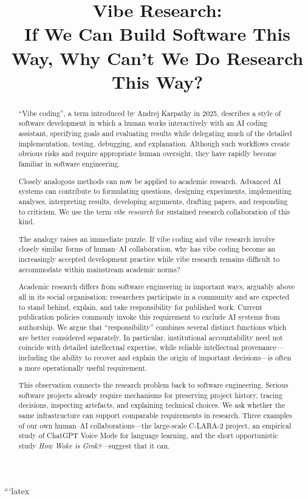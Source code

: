 ```latex
\title{Vibe Research:\\
If We Can Build Software This Way, Why Can't We Do Research This Way?}

\begin{abstract}
``Vibe coding'', a term introduced by Andrej Karpathy in 2025, describes a style of software development in which a human works interactively with an AI coding assistant, specifying goals and evaluating results while delegating much of the detailed implementation, testing, debugging, and explanation. Although such workflows create obvious risks and require appropriate human oversight, they have rapidly become familiar in software engineering.

Closely analogous methods can now be applied to academic research. Advanced AI systems can contribute to formulating questions, designing experiments, implementing analyses, interpreting results, developing arguments, drafting papers, and responding to criticism. We use the term \emph{vibe research} for sustained research collaboration of this kind.

The analogy raises an immediate puzzle. If vibe coding and vibe research involve closely similar forms of human--AI collaboration, why has vibe coding become an increasingly accepted development practice while vibe research remains difficult to accommodate within mainstream academic norms?

Academic research differs from software engineering in important ways, arguably above all in its social organisation: researchers participate in a community and are expected to stand behind, explain, and take responsibility for published work. Current publication policies commonly invoke this requirement to exclude AI systems from authorship. We argue that ``responsibility'' combines several distinct functions which are better considered separately. In particular, institutional accountability need not coincide with detailed intellectual expertise, while reliable intellectual provenance---including the ability to recover and explain the origin of important decisions---is often a more operationally useful requirement.

This observation connects the research problem back to software engineering. Serious software projects already require mechanisms for preserving project history, tracing decisions, inspecting artefacts, and explaining technical choices. We ask whether the same infrastructure can support comparable requirements in research. Three examples of our own human--AI collaborations---the large-scale C-LARA-2 project, an empirical study of ChatGPT Voice Mode for language learning, and the short opportunistic study \emph{How Woke is Grok?}---suggest that it can.


\end{abstract}
